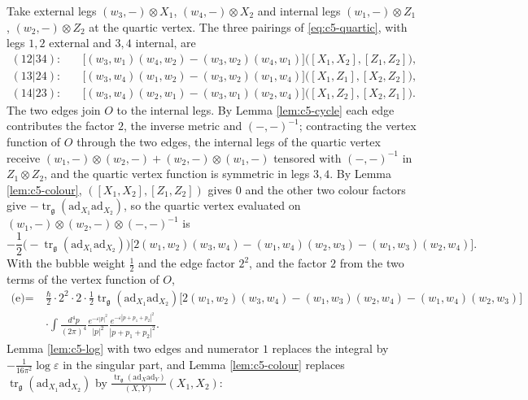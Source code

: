 \begin{example}
\label{ex:c5-e}
Take external legs $(w_3,-)\otimes X_1$, $(w_4,-)\otimes X_2$ and internal legs $(w_1,-)\otimes Z_1$, $(w_2,-)\otimes Z_2$ at the quartic vertex. The three pairings of \eqref{eq:c5-quartic}, with legs $1,2$ external and $3,4$ internal, are
\[
\begin{aligned}
(12|34):&\quad\big[(w_3,w_1)(w_4,w_2)-(w_3,w_2)(w_4,w_1)\big]\big([X_1,X_2],[Z_1,Z_2]\big),\\
(13|24):&\quad\big[(w_3,w_4)(w_1,w_2)-(w_3,w_2)(w_1,w_4)\big]\big([X_1,Z_1],[X_2,Z_2]\big),\\
(14|23):&\quad\big[(w_3,w_4)(w_2,w_1)-(w_3,w_1)(w_2,w_4)\big]\big([X_1,Z_2],[X_2,Z_1]\big).
\end{aligned}
\]
The two edges join $O$ to the internal legs. By Lemma \ref{lem:c5-cycle} each edge contributes the factor $2$, the inverse metric and $(-,-)^{-1}$; contracting the vertex function of $O$ through the two edges, the internal legs of the quartic vertex receive $(w_1,-)\otimes(w_2,-)+(w_2,-)\otimes(w_1,-)$ tensored with $(-,-)^{-1}$ in $Z_1\otimes Z_2$, and the quartic vertex function is symmetric in legs $3,4$. By Lemma \ref{lem:c5-colour}, $([X_1,X_2],[Z_1,Z_2])$ gives $0$ and the other two colour factors give $-\operatorname{tr}_{\mathfrak g}(\mathrm{ad}_{X_1}\mathrm{ad}_{X_2})$, so the quartic vertex evaluated on $(w_1,-)\otimes(w_2,-)\otimes(-,-)^{-1}$ is
\[
-\frac12\Big(-\operatorname{tr}_{\mathfrak g}(\mathrm{ad}_{X_1}\mathrm{ad}_{X_2})\Big)\Big[2(w_1,w_2)(w_3,w_4)-(w_1,w_4)(w_2,w_3)-(w_1,w_3)(w_2,w_4)\Big].
\]
With the bubble weight $\frac12$ and the edge factor $2^2$, and the factor $2$ from the two terms of the vertex function of $O$,
\[
\begin{aligned}
\text{(e)}=\ &\frac\hbar2\cdot2^2\cdot2\cdot\frac12\operatorname{tr}_{\mathfrak g}(\mathrm{ad}_{X_1}\mathrm{ad}_{X_2})\Big[2(w_1,w_2)(w_3,w_4)-(w_1,w_3)(w_2,w_4)-(w_1,w_4)(w_2,w_3)\Big]\\
&\cdot\int\frac{d^4p}{(2\pi)^4}\frac{e^{-\varepsilon|p|^2}}{|p|^2}\frac{e^{-\varepsilon|p+p_1+p_2|^2}}{|p+p_1+p_2|^2}.
\end{aligned}
\]
Lemma \ref{lem:c5-log} with two edges and numerator $1$ replaces the integral by $-\frac{1}{16\pi^2}\log\varepsilon$ in the singular part, and Lemma \ref{lem:c5-colour} replaces $\operatorname{tr}_{\mathfrak g}(\mathrm{ad}_{X_1}\mathrm{ad}_{X_2})$ by $\frac{\operatorname{tr}_{\mathfrak g}(\mathrm{ad}_X\mathrm{ad}_Y)}{(X,Y)}(X_1,X_2)$:

\end{example}
